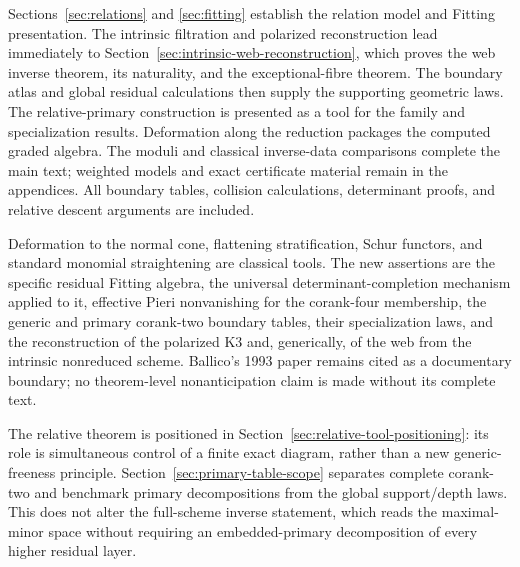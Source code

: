 Sections~\ref{sec:relations} and \ref{sec:fitting} establish the
relation model and Fitting presentation.  The intrinsic filtration
and polarized reconstruction lead immediately to
Section~\ref{sec:intrinsic-web-reconstruction}, which proves the web
inverse theorem, its naturality, and the exceptional-fibre theorem.
The boundary atlas and global residual calculations then supply the
supporting geometric laws.  The relative-primary construction is
presented as a tool for the family and specialization results.
Deformation along the reduction packages the computed graded algebra.
The moduli and classical inverse-data comparisons complete the main
text; weighted models and exact certificate material remain in the
appendices.  All boundary tables, collision calculations, determinant
proofs, and relative descent arguments are included.

Deformation to the normal cone, flattening stratification, Schur
functors, and standard monomial straightening are classical tools.
The new assertions are the specific residual Fitting algebra, the
universal determinant-completion mechanism applied to it, effective
Pieri nonvanishing for the corank-four membership, the generic and
primary corank-two boundary tables, their specialization laws, and
the reconstruction of the polarized K3 and, generically, of the web
from the intrinsic nonreduced scheme.  Ballico's 1993 paper remains cited as a documentary boundary;
no theorem-level nonanticipation claim is made without its complete
text.

The relative theorem is positioned in
Section~\ref{sec:relative-tool-positioning}: its role is simultaneous
control of a finite exact diagram, rather than a new generic-freeness
principle.  Section~\ref{sec:primary-table-scope} separates complete
corank-two and benchmark primary decompositions from the global
support/depth laws.  This does not alter the full-scheme inverse
statement, which reads the maximal-minor space without requiring an
embedded-primary decomposition of every higher residual layer.

